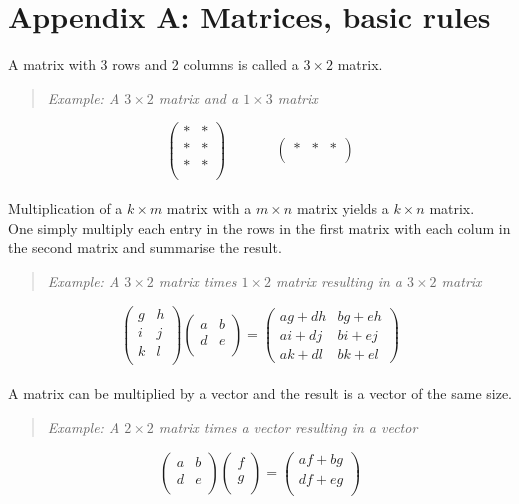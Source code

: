 \documentclass{article}
\begin{document}
\section*{Appendix A: Matrices, basic rules}
A matrix with 3 rows and 2 columns is called a $3\times2$ matrix.
\begin{quote}
\textit{Example: A $3 \times 2$ matrix and a $1 \times 3$ matrix}
\end{quote}
$$\begin{pmatrix}
* & * \\
* & * \\
* & * \\
\end{pmatrix}~~~~~~~~~~~~~~~~
\begin{pmatrix}
* & * & *\\
\end{pmatrix}$$
\\
Multiplication of a $k\times m$ matrix with a $m \times n$ matrix yields a $k \times n$ matrix.
\\One simply multiply each entry in the rows in the first matrix with each colum in the second matrix and summarise the result. 
\begin{quote}
\textit{Example: A $3 \times 2$ matrix times $1 \times 2$ matrix resulting in a $3 \times 2$ matrix}
\end{quote}$$
\begin{pmatrix}
g & h \\
i & j \\
k & l \\
\end{pmatrix}
\begin{pmatrix}
a & b \\
d & e \\
\end{pmatrix}=
\begin{pmatrix}
ag + dh & bg + eh \\
ai + dj & bi + ej \\
ak + dl & bk + el
\end{pmatrix}
$$
\\
A matrix can be multiplied by a vector and the result is a vector of the same size.
\begin{quote}
\textit{Example: A $2 \times 2$ matrix times a vector resulting in a vector}
\end{quote}$$
\begin{pmatrix}
a & b \\
d & e \\
\end{pmatrix}
\begin{pmatrix}
f \\
g \\
\end{pmatrix} =
\begin{pmatrix}
af + bg \\
df + eg \\
\end{pmatrix}
$$
\\
\end{document}
